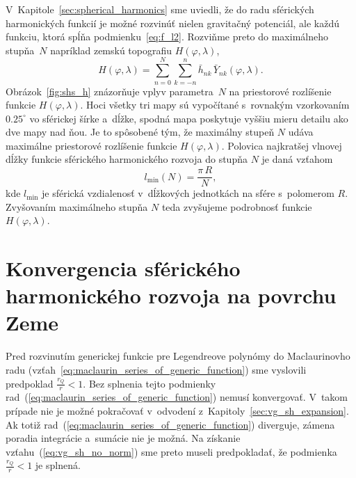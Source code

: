 \documentclass[a4paper,12pt]{book}
\begin{document}
V~Kapitole~\ref{sec:spherical_harmonics} sme uviedli, že do radu sférických
harmonických funkcií je možné rozvinúť nielen gravitačný potenciál, ale každú
funkciu, ktorá spĺňa podmienku~\ref{eq:f_l2}.  Rozviňme preto do maximálneho 
stupňa~$N$ napríklad zemskú topografiu $H(\varphi, \lambda)$,
%
\begin{equation}
\label{eq:h_shs}
H(\varphi, \lambda) = \sum_{n = 0}^{N} \sum_{k = -n}^n \bar{h}_{nk} \,
\bar{Y}_{nk}(\varphi, \lambda){.}
\end{equation}
%
Obrázok~\ref{fig:shs_h} znázorňuje vplyv parametra~$N$ na priestorové
rozlíšenie funkcie $H(\varphi, \lambda)$.  Hoci všetky tri mapy sú vypočítané
s~rovnakým vzorkovaním $0.25^{\circ}$ vo sférickej šírke a~dĺžke, spodná mapa
poskytuje vyššiu mieru detailu ako dve mapy nad ňou.  Je to spôsobené tým, že
maximálny stupeň $N$ udáva maximálne priestorové rozlíšenie funkcie
$H(\varphi,\lambda)$.  Polovica najkratšej vlnovej dĺžky funkcie sférického
harmonického rozvoja do stupňa $N$ je daná vzťahom
%
\begin{equation}
l_{\min}(N) = \frac{\pi \, R}{N}{,}
\end{equation}
%
kde $l_{\min}$ je sférická vzdialenosť v~dĺžkových jednotkách na sfére 
s~polomerom $R$.  Zvyšovaním
maximálneho stupňa $N$ teda zvyšujeme podrobnosť funkcie $H(\varphi, \lambda)$.








\section{Konvergencia sférického harmonického rozvoja na povrchu Zeme}
\label{sec:convergence_of_spherical_harmonics}

Pred rozvinutím generickej funkcie pre Legendreove polynómy do Maclaurinovho 
radu (vzťah~\ref{eq:maclaurin_series_of_generic_function}) sme vyslovili 
predpoklad $\frac{r_Q}{r} < 1$.  Bez splnenia tejto podmienky 
rad~(\ref{eq:maclaurin_series_of_generic_function}) nemusí konvergovať.  
V~takom prípade nie je možné pokračovať v~odvodení 
z~Kapitoly~\ref{sec:vg_sh_expansion}.  Ak totiž 
rad~(\ref{eq:maclaurin_series_of_generic_function}) diverguje, zámena poradia 
integrácie a~sumácie nie je možná.  Na získanie vzťahu~(\ref{eq:vg_sh_no_norm}) 
sme preto museli predpokladať, že podmienka $\frac{r_Q}{r} < 1$ je splnená.
\end{document}
